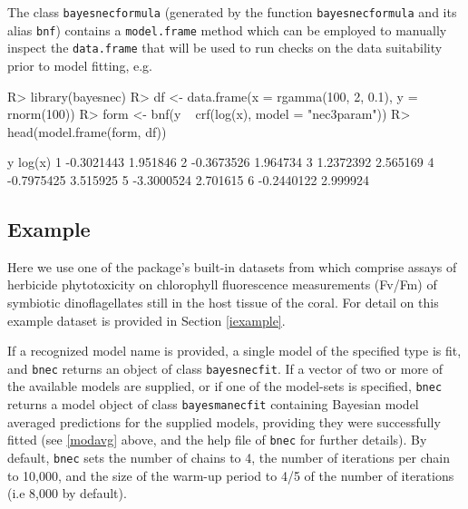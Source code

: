 \documentclass[
  shortnames]{jss}
\begin{document}
The class \texttt{bayesnecformula} (generated by the function \texttt{bayesnecformula} and its alias \texttt{bnf}) contains a \texttt{model.frame} method which can be employed to manually inspect the \texttt{data.frame} that will be used to run checks on the data suitability prior to model fitting, e.g.

\begin{CodeChunk}
\begin{CodeInput}
R> library(bayesnec)
R> df <- data.frame(x = rgamma(100, 2, 0.1), y = rnorm(100))
R> form <- bnf(y ~ crf(log(x), model = "nec3param"))
R> head(model.frame(form, df))
\end{CodeInput}
\begin{CodeOutput}
           y   log(x)
1 -0.3021443 1.951846
2 -0.3673526 1.964734
3  1.2372392 2.565169
4 -0.7975425 3.515925
5 -3.3000524 2.701615
6 -0.2440122 2.999924
\end{CodeOutput}
\end{CodeChunk}

\hypertarget{example}{%
\subsection{Example}\label{example}}

Here we use one of the package's built-in datasets from \citet{jones2003meps} which comprise assays of herbicide phytotoxicity on chlorophyll fluorescence measurements (Fv/Fm) of symbiotic dinoflagellates still in the host tissue of the coral. For detail on this example dataset is provided in Section \ref{iexample}.

\begin{CodeChunk}
\end{CodeChunk}

If a recognized model name is provided, a single model of the specified type is fit, and \texttt{bnec} returns an object of class \texttt{bayesnecfit}. If a vector of two or more of the available models are supplied, or if one of the model-sets is specified, \texttt{bnec} returns a model object of class \texttt{bayesmanecfit} containing Bayesian model averaged predictions for the supplied models, providing they were successfully fitted (see \ref{modavg} above, and the help file of \texttt{bnec} for further details). By default, \texttt{bnec} sets the number of chains to 4, the number of iterations per chain to 10,000, and the size of the warm-up period to 4/5 of the number of iterations (i.e 8,000 by default).
\end{document}
